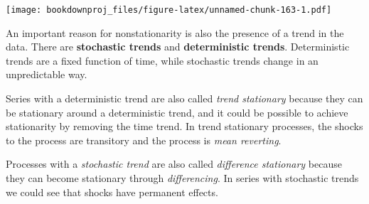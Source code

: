 \documentclass[
]{article}
\newenvironment{Shaded}{\begin{snugshade}}{\end{snugshade}}
\newcommand{\CommentTok}[1]{\textcolor[rgb]{0.56,0.35,0.01}{\textit{#1}}}
\newcommand{\DataTypeTok}[1]{\textcolor[rgb]{0.13,0.29,0.53}{#1}}
\newcommand{\DecValTok}[1]{\textcolor[rgb]{0.00,0.00,0.81}{#1}}
\newcommand{\KeywordTok}[1]{\textcolor[rgb]{0.13,0.29,0.53}{\textbf{#1}}}
\newcommand{\NormalTok}[1]{#1}
\newcommand{\OperatorTok}[1]{\textcolor[rgb]{0.81,0.36,0.00}{\textbf{#1}}}
\newcommand{\StringTok}[1]{\textcolor[rgb]{0.31,0.60,0.02}{#1}}
\begin{document}
\begin{Shaded}
\end{Shaded}

\texttt{[image: bookdownproj\_files/figure-latex/unnamed-chunk-163-1.pdf]}

An important reason for nonstationarity is also the presence of a trend in the data. There are \textbf{stochastic trends} and \textbf{deterministic trends}. Deterministic trends are a fixed function of time, while stochastic trends change in an unpredictable way.

Series with a deterministic trend are also called \emph{trend stationary} because they can be stationary around a deterministic trend, and it could be possible to achieve stationarity by removing the time trend. In trend stationary processes, the shocks to the process are transitory and the process is \emph{mean reverting}.

Processes with a \emph{stochastic trend} are also called \emph{difference stationary} because they can become stationary through \emph{differencing}. In series with stochastic trends we could see that shocks have permanent effects.
\end{document}
